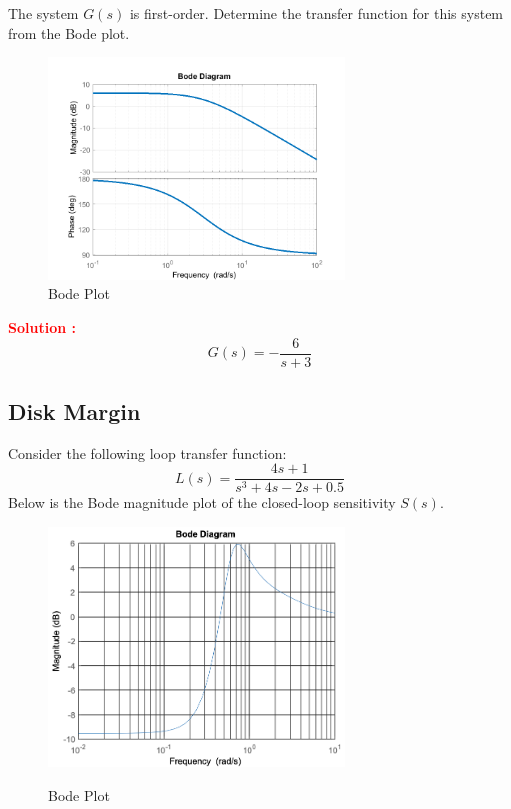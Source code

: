 \documentclass[12pt]{article}
\begin{document}
The system \(G(s)\) is first-order. Determine the transfer function for this system from the Bode plot.
\begin{figure}[H]
    \centering
    \includegraphics[width=0.7\textwidth]{figs/6.5.png}
    \caption{Bode Plot}
    \label{fig:89}
\end{figure}
\textbf{\textcolor{red}{Solution :}}
\[G(s) = - \frac{6}{s+3}\]
\clearpage

\subsection{Disk Margin}

Consider the following loop transfer function:
\begin{equation}
    L(s)  = \frac{4s+1}{s^3 + 4s - 2s + 0.5}
\end{equation}
Below is the Bode magnitude plot of the closed-loop sensitivity $S(s)$. 

\begin{figure}[h]
        \centering
        \includegraphics[width=0.7\textwidth]{figs/6.6.png}
        \label{fig:nyquist_92}
        \caption{Bode Plot}
\end{figure}
\end{document}
